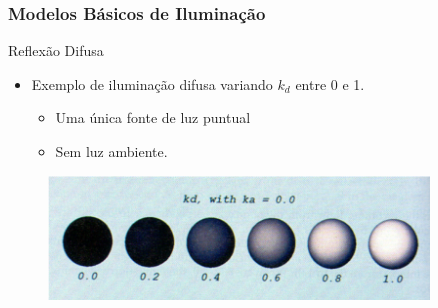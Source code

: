 \documentclass{beamer}
\begin{document}
\begin{frame}
\frametitle{Modelos Básicos de Iluminação}

	\begin{block}{Reflexão Difusa}
		\begin{itemize}
			\item Exemplo de iluminação difusa variando $k_d$ entre 0 e 1.
				\begin{itemize}
					\item Uma única fonte de luz puntual
					\item Sem luz ambiente.	
				\end{itemize}								 
		\end{itemize}
	\end{block}
	
	\begin{figure}[!h]
		\begin{center}
		\includegraphics[width=0.9\textwidth]{Figures/ExeIlu}
		\end{center}
	\end{figure}	
\end{frame}


\end{document}
